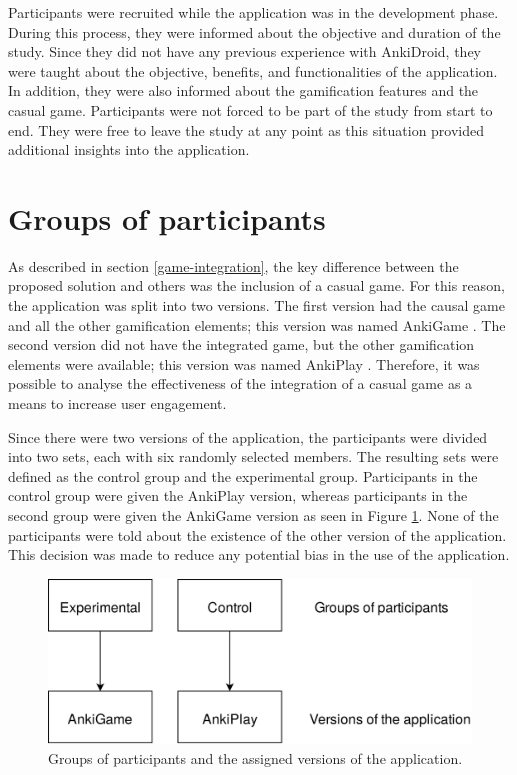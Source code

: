 Participants were recruited while the application was in the development phase. During this process, they were informed about the objective and duration of the study. Since they did not have any previous experience with AnkiDroid, they were taught about the objective, benefits, and functionalities of the application. In addition, they were also informed about the gamification features and the casual game. Participants were not forced to be part of the study from start to end. They were free to leave the study at any point as this situation provided additional insights into the application.

\section{Groups of participants}
As described in section \ref{game-integration}, the key difference between the proposed solution and others was the inclusion of a casual game. For this reason, the application was split into two versions. The first version had the causal game and all the other gamification elements; this version was named AnkiGame \citep{velasquez2018ankigame}. The second version did not have the integrated game, but the other gamification elements were available; this version was named AnkiPlay \citep{velasquez2018ankiplay}. Therefore, it was possible to analyse the effectiveness of the integration of a casual game as a means to increase user engagement.

Since there were two versions of the application, the participants were divided into two sets, each with six randomly selected members. The resulting sets were defined as the control group and the experimental group. Participants in the control group were given the AnkiPlay version, whereas participants in the second group were given the AnkiGame version as seen in Figure \ref{fig:participants-version}. None of the participants were told about the existence of the other version of the application. This decision was made to reduce any potential bias in the use of the application.

\begin{figure}[htb]
    \vskip 5mm
        \begin{center}
            \includegraphics[scale=0.25]{./Figures/participants_version.png}
            \caption{Groups of participants and the assigned versions of the application.}
            \label{fig:participants-version}
        \end{center}
    \vskip -5mm
\end{figure}

